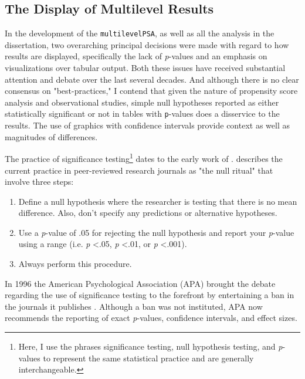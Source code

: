 \documentclass[letterpaper,12p,twoside]{article} %
\begin{document}
\subsection{The Display of Multilevel Results}

In the development of the \texttt{multilevelPSA}, as well as all the analysis in the dissertation, two overarching principal decisions were made with regard to how results are displayed, specifically the lack of \textit{p}-values and an emphasis on visualizations over tabular output. Both these issues have received substantial attention and debate over the last several decades. And although there is no clear consensus on "best-practices," I contend that given the nature of propensity score analysis and observational studies, simple null hypotheses reported as either statistically significant or not in tables with \texttt{p}-values does a disservice to the results. The use of graphics with confidence intervals provide context as well as magnitudes of differences.


The practice of significance testing\footnote{Here, I use the phrases significance testing, null hypothesis testing, and \textit{p}-values to represent the same statistical practice and are generally interchangeable.} dates to the early work of .  describes the current practice in peer-reviewed research journals as "the null ritual" that involve three steps:

\begin{enumerate}
    \item Define a null hypothesis where the researcher is testing that there is no mean difference. Also, don't specify any predictions or alternative hypotheses.
    \item Use a \textit{p}-value of .05 for rejecting the null hypothesis and report your \textit{p}-value using a range (i.e. \textit{p} \textless .05, \textit{p} \textless .01, or \textit{p} \textless .001).
    \item Always perform this procedure.
\end{enumerate}

\noindent In 1996 the American Psychological Association (APA) brought the debate regarding the use of significance testing to the forefront by entertaining a ban in the journals it publishes \cite{Shrout1997,Hunter1997,Harris1997,Abelson1997,Scarr1997,Estes1997}. Although a ban was not instituted, APA now recommends the reporting of exact \textit{p}-values, confidence intervals, and effect sizes. 
\end{document}
